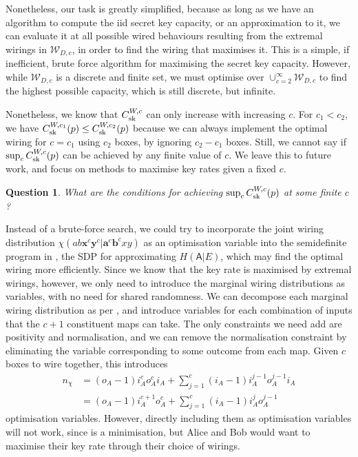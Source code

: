 \documentclass[10pt, a4paper]{article}
\numberwithin{equation}{section} %
\theoremstyle{definition}
\theoremstyle{plain}
\newtheorem{question}{Question}
\newcommand{\?}{\mathrel{?}} %
\newcommand{\cvec}[1]{\boldsymbol{\mathbf{#1}}}    %
\newcommand{\sW}{\mathcal{W}}
\newcommand{\crv}[1]{\mathsf{#1}}
\newcommand{\sk}{\rm sk}
\begin{document}
                      Nonetheless, our task is greatly simplified, because as long as we have an algorithm to compute the iid secret key capacity, or an approximation to it, we can evaluate it at all possible wired behaviours resulting from the extremal wirings in \(\sW_{D,c}\), in order to find the wiring that maximises it. This is a simple, if inefficient, brute force algorithm for maximising the secret key capacity. However, while \(\sW_{D,c}\) is a discrete and finite set, we must optimise over \(\cup_{c=2}^{\infty} \sW_{D,c}\) to find the highest possible capacity, which is still discrete, but infinite.

                      Nonetheless, we know that \(C_{\sk}^{W,c}\) can only increase with increasing \(c\). For \(c_1 < c_2\), we have \(C^{W,c_1}_{\sk}(p) \leq C^{W,c_2}_{\sk}(p)\) because we can always implement the optimal wiring for \(c = c_1\) using \(c_2\) boxes, by ignoring \(c_2 - c_1\) boxes. Still, we cannot say if \(\sup_c C_{\sk}^{W,c}(p)\) can be achieved by any finite value of \(c\). We leave this to future work, and focus on methods to maximise key rates given a fixed \(c\).
                      \begin{question}
                        What are the conditions for achieving \(\sup_c C_{\sk}^{W,c}(p)\) at some finite \(c\)?
                      \end{question}

                      Instead of a brute-force search, we could try to incorporate the joint wiring distribution \(\chi(ab\cvec{x}^c\cvec{y}^c|\cvec{a}^c\cvec{b}^cxy)\) as an optimisation variable into the semidefinite program in , the SDP for approximating \(H(\crv{A}|E)\), which may find the optimal wiring more efficiently. Since we know that the key rate is maximised by extremal wirings, however, we only need to introduce the marginal wiring distributions as variables, with no need for shared randomness. We can decompose each marginal wiring distribution as per , and introduce variables for each combination of inputs that the \(c+1\) constituent maps can take. The only constraints we need add are positivity and normalisation, and we can remove the normalisation constraint by eliminating the variable corresponding to some outcome from each map. Given \(c\) boxes to wire together, this introduces
                      \begin{align}
                        n_{\chi} &= (o_A - 1) i_A^c o_A^c i_A + \sum_{j=1}^c (i_A-1) i_A^{j-1} o_A^{j-1} i_A \nonumber \\
                                 &= (o_A - 1) i_A^{c+1} o_A^c + \sum_{j=1}^c (i_A-1) i_A^{j} o_A^{j-1}
                      \end{align}
                      optimisation variables. However, directly including them as optimisation variables will not work, since  is a minimisation, but Alice and Bob would want to maximise their key rate through their choice of wirings.
\end{document}
